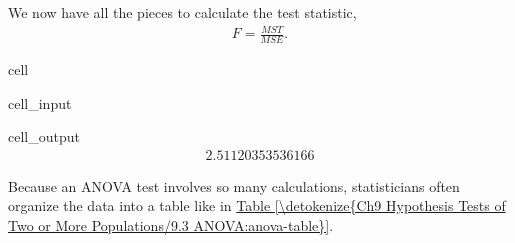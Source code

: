\documentclass[letterpaper,10pt,english]{jupyterBook}
\begin{document}
\sphinxAtStartPar
We now have all the pieces to calculate the test statistic,
\begin{equation*}
\begin{split} F = \frac{MST}{MSE}. \end{split}
\end{equation*}
\begin{sphinxuseclass}{cell}\begin{sphinxVerbatimInput}

\begin{sphinxuseclass}{cell_input}
\begin{sphinxVerbatim}[commandchars=\\\{\}]
\end{sphinxVerbatim}

\end{sphinxuseclass}\end{sphinxVerbatimInput}
\begin{sphinxVerbatimOutput}

\begin{sphinxuseclass}{cell_output}\begin{equation*}
\begin{split}2.51120353536166\end{split}
\end{equation*}
\end{sphinxuseclass}\end{sphinxVerbatimOutput}

\end{sphinxuseclass}
\sphinxAtStartPar
Because an ANOVA test involves so many calculations, statisticians often organize the data into a table like in \hyperref[\detokenize{Ch9 Hypothesis Tests of Two or More Populations/9.3 ANOVA:anova-table}]{Table \ref{\detokenize{Ch9 Hypothesis Tests of Two or More Populations/9.3 ANOVA:anova-table}}}.
\end{document}
